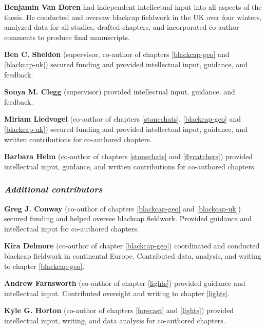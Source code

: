 \documentclass[a4paper, nobind]{templates/ociamthesis}
\begin{document}
\begin{romanpages}
\begin{contributions}
 	\textbf{Benjamin Van Doren} had independent intellectual input into all aspects of the thesis. He conducted and oversaw blackcap fieldwork in the UK over four winters, analyzed data for all studies, drafted chapters, and incorporated co-author comments to produce final manuscripts.

\vspace{8pt}

\textbf{Ben C. Sheldon} (supervisor, co-author of chapters \ref{blackcap-geo} and \ref{blackcap-uk}) secured funding and provided intellectual input, guidance, and feedback.

\textbf{Sonya M. Clegg} (supervisor) provided intellectual input, guidance, and feedback.

\textbf{Miriam Liedvogel} (co-author of chapters \ref{stonechats}, \ref{blackcap-geo} and \ref{blackcap-uk}) secured funding and provided intellectual input, guidance, and written contributions for co-authored chapters.

\textbf{Barbara Helm} (co-author of chapters \ref{stonechats} and \ref{flycatchers}) provided intellectual input, guidance, and written contributions for co-authored chapters.

\hypertarget{additional-contributors}{%
\subsubsection{\texorpdfstring{\emph{Additional contributors}}{Additional contributors}}\label{additional-contributors}}

\textbf{Greg J. Conway} (co-author of chapters \ref{blackcap-geo} and \ref{blackcap-uk}) secured funding and helped oversee blackcap fieldwork. Provided guidance and intellectual input for co-authored chapters.

\textbf{Kira Delmore} (co-author of chapter \ref{blackcap-geo}) coordinated and conducted blackcap fieldwork in continental Europe. Contributed data, analysis, and writing to chapter \ref{blackcap-geo}.

\textbf{Andrew Farnsworth} (co-author of chapter \ref{lights}) provided guidance and intellectual input. Contributed oversight and writing to chapter \ref{lights}.

\textbf{Kyle G. Horton} (co-author of chapters \ref{forecast} and \ref{lights}) provided intellectual input, writing, and data analysis for co-authored chapters.


\end{contributions}
\end{romanpages}
\end{document}
